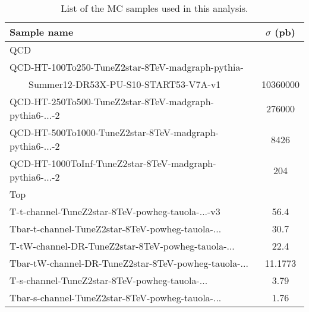 \begin{table}[!htb]
\begin{center}
\caption{List of the MC samples used in this analysis.}
\label{Tab.MCSamples}
\begin{tabular}{|l|c|}
\hline
Sample name                                                                    & $\sigma$ (pb) \\\hline
QCD &  \\\hline
QCD-HT-100To250-TuneZ2star-8TeV-madgraph-pythia- &\\
~~~~Summer12-DR53X-PU-S10-START53-V7A-v1    & 10360000 \\
QCD-HT-250To500-TuneZ2star-8TeV-madgraph-pythia6-...-2  & 276000 \\
QCD-HT-500To1000-TuneZ2star-8TeV-madgraph-pythia6-...-2 & 8426 \\
QCD-HT-1000ToInf-TuneZ2star-8TeV-madgraph-pythia6-...-2 & 204 \\\hline


Top &  \\\hline
T-t-channel-TuneZ2star-8TeV-powheg-tauola-...-v3    & 56.4\\ %
Tbar-t-channel-TuneZ2star-8TeV-powheg-tauola-...    & 30.7 \\%
T-tW-channel-DR-TuneZ2star-8TeV-powheg-tauola-...   & 22.4 \\%
Tbar-tW-channel-DR-TuneZ2star-8TeV-powheg-tauola-...& 11.1773\\%
T-s-channel-TuneZ2star-8TeV-powheg-tauola-...       & 3.79\\%
Tbar-s-channel-TuneZ2star-8TeV-powheg-tauola-...    & 1.76\\%


\end{tabular}
\end{center}
\end{table}
